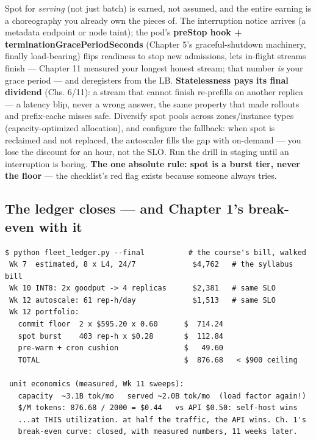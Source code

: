Spot for \textit{serving} (not just batch) is earned, not assumed, and the entire earning is a choreography you already own the pieces of. The interruption notice arrives (a metadata endpoint or node taint); the pod's \textbf{preStop hook + terminationGracePeriodSeconds} (Chapter 5's graceful-shutdown machinery, finally load-bearing) flips readiness to stop new admissions, lets in-flight streams finish — Chapter 11 measured your longest honest stream; that number \textit{is} your grace period — and deregisters from the LB. \textbf{Statelessness pays its final dividend} (Chs. 6/11): a stream that cannot finish re-prefills on another replica — a latency blip, never a wrong answer, the same property that made rollouts and prefix-cache misses safe. Diversify spot pools across zones/instance types (capacity-optimized allocation), and configure the fallback: when spot is reclaimed and not replaced, the autoscaler fills the gap with on-demand — you lose the discount for an hour, not the SLO. Run the drill in staging until an interruption is boring. \textbf{The one absolute rule: spot is a burst tier, never the floor} — the checklist's red flag exists because someone always tries.

\subsection*{The ledger closes — and Chapter 1's break-even with it}

\begin{terminalbox}
\begin{Verbatim}[breaklines=true,breakanywhere=true,fontsize=\small,formatcom=\color{tbbtermfg},codes=\tbbcodeactive]
$ python fleet_ledger.py --final          # the course's bill, walked
 Wk 7  estimated, 8 x L4, 24/7             $4,762   # the syllabus bill
 Wk 10 INT8: 2x goodput -> 4 replicas      $2,381   # same SLO
 Wk 12 autoscale: 61 rep-h/day             $1,513   # same SLO
 Wk 12 portfolio:
   commit floor  2 x $595.20 x 0.60      $  714.24
   spot burst    403 rep-h x $0.28       $  112.84
   pre-warm + cron cushion               $   49.60
   TOTAL                                 $  876.68   < $900 ceiling

 unit economics (measured, Wk 11 sweeps):
   capacity  ~3.1B tok/mo   served ~2.0B tok/mo  (load factor again!)
   $/M tokens: 876.68 / 2000 = $0.44   vs API $0.50: self-host wins
   ...at THIS utilization. at half the traffic, the API wins. Ch. 1's
   break-even curve: closed, with measured numbers, 11 weeks later.
\end{Verbatim}
\end{terminalbox}


